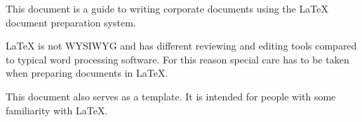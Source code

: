 This document is a guide to writing corporate documents using the LaTeX document preparation system.

LaTeX is not WYSIWYG and has different reviewing and editing tools compared to typical word processing software. For this reason special care has to be taken when preparing documents in LaTeX. 

This document also serves as a template. It is intended for people with some familiarity with LaTeX.